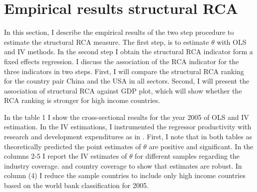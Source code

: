 \section{Empirical results structural RCA}
\label{sec:cross-section}
In this section, I describe the empirical results of the two step procedure to estimate the structural RCA measure.  The first step, is to estimate $\theta$ with OLS and IV methods. %
In the second step I obtain the structural RCA indicator form a fixed effects regression. I discuss the association of the RCA indicator for the three indicators in two steps. First, I will compare the structural RCA ranking for the country pair China and the USA in all sectors. Second, I will present the association of structural RCA against GDP plot, which will show whether the RCA ranking is stronger for high income countries.
\par
In the table  1 I show the cross-sectional results for the year 2005 of OLS and IV estimation. In the IV estimations, I instrumented the regressor productivity with research and development expenditures as in  \textcite{costinot}. First, I note that in both tables as theoretically predicted the point estimates of $\theta$ are positive and significant.  In the columns 2-5 I report the IV estimates of $\theta$  for different samples regarding  the industry coverage. and country coverage to show that estimates are robust. In column (4) I reduce the sample countries to include only high income countries based on the world bank classification for 2005.
